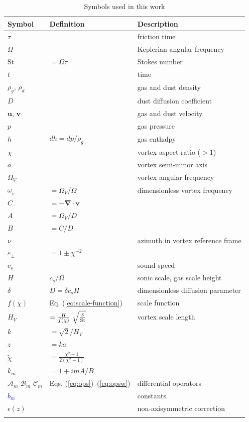 \documentclass[apj]{emulateapj}
\renewcommand{\v}[1]{{\boldsymbol{#1}}} %
\def\blue#1{\textcolor{blue}{#1}}
\newcommand{\del}{\v{\nabla}}
\newcommand{\Div}{\del\cdot}
\newcommand{\Eq}[1]{Eq. (\ref{#1})}
\newcommand{\Eqss}[2]{Eqs. (\ref{#1})--(\ref{#2})}
\newcommand{\eq}[1]{\Eq{#1}}
\newcommand{\eqss}[2]{\Eqss{#1}{#2}}
\newcommand{\St}{{\rm St}}
\begin{document}
\begin{table}
\caption[]{Symbols used in this work}
\label{table:symbols}
\begin{center}
\begin{tabular}{l l l}\hline
Symbol & Definition & Description \\\hline
$\tau$ && friction time\\
$\varOmega$ & & Keplerian angular frequency \\
\St & $= \varOmega \tau$ & Stokes number \\
$t$ &  & time \\
$\rho_g$, $\rho_d$  & & gas and dust density\\
$D$ & & dust diffusion coefficient \\
$\v{u}$, $\v{v}$ & & gas and dust velocity\\
$p$ && gas pressure \\
$h$ &$dh=dp/\rho_g$ & gas enthalpy\\
$\chi$ & & vortex aspect ratio ($>1$) \\
$a$ & & vortex semi-minor axis \\
$\varOmega_V$ & & vortex angular frequency \\
$\omega_{_V}$ &  $=\varOmega_V$/$\varOmega$ & dimensionless vortex frequency  \\
$C$ & $=-\Div{\v{v}}$ &  \\
$A$ & $=\varOmega_V/D$ & \\
$B$  &$=C/D$ & \\
$\nu$ & & azimuth in vortex reference frame\\
$\varepsilon_\pm$ & $ = 1\pm\chi^{-2}$ \\
$c_s$ & & sound speed \\
$H$ & $c_s/\varOmega$ & sonic scale, gas scale height\\
$\delta$ & $D=\delta c_s H$ & dimensionless diffusion parameter\\
$f(\chi)$ & \eq{eq:scale-function} & scale function \\
$H_V$ & $=\frac{H}{f(\chi)} \ \sqrt{\frac{\delta}{\St}}$ & vortex scale length \\
$k$ & $=\sqrt{2}/H_V$ & \\ 
$z$ & $=ka$ & \\
$\tilde\chi$ & $=\frac{\chi^2-1}{2(\chi^2+1)}$ & \\
$k_m$ & $= 1+imA/B$ & \\
$\mathcal{A}_m$ $\mathcal{B}_m$ $\mathcal{C}_m$  &\eqss{eq:ops}{eq:opsw} & differential operators \\
\blue{$b_m$} & & constants\\
$\epsilon(z)$ & & non-axisymmetric correction \\
 & & \\ \hline
\end{tabular}
\end{center}
\end{table}
\end{document}
